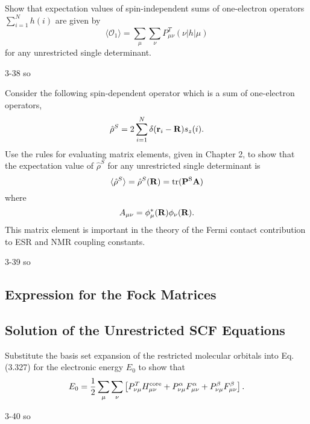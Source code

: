 \documentclass[a4paper]{book}
\newcommand\tr[1]{\mathrm{tr(#1)}}
\newcommand{\core}{{\rm core}}
\newcommand{\R}{{\bf R}}
\begin{document}
	\begin{exercise}
	Show that expectation values of spin-independent sums of one-electron operators $\sum_{i=1}^N h(i)$ are given by
	\[
		\langle \mathscr{O}_1 \rangle = \sum_\mu \sum_\nu P^T_{\mu\nu} ( \nu | h | \mu )
	\]
	for any unrestricted single determinant.
	\end{exercise}
	
	\begin{solution}
		3-38 so
	\end{solution}
	
	\begin{exercise}
	Consider the following spin-dependent operator which is a sum of one-electron operators,
	\[
		\hat{\rho}^S = 2 \sum_{i=1}^N \delta( {\bf r}_i - {\bf R} )s_z(i).
	\]
	Use the rules for evaluating matrix elements, given in Chapter 2, to show that the expectation value of $\hat{\rho}^S$ for any unrestricted single determinant is
	\[
		\langle \hat{\rho}^S \rangle = \hat{\rho}^S ({\bf R}) = \tr{  {\bf P}^S {\bf A}} 
	\]
	where
	\[
		A_{\mu\nu} = \phi^*_\mu (\R) \phi_\nu (\R).
	\]
	This matrix element is important in the theory of the Fermi contact contribution to ESR and NMR coupling constants.
	\end{exercise}
	
	\begin{solution}
		3-39 so
	\end{solution}
	
	\subsection{Expression for the Fock Matrices}
	
	\subsection{Solution of the Unrestricted SCF Equations}
	
	\begin{exercise}
	Substitute the basis set expansion of the restricted molecular orbitals into Eq.(3.327) for the electronic energy $E_0$ to show that
	\[
		E_0 = \frac{1}{2} \sum_\mu \sum_\nu \left[ P^T_{\nu\mu} H^{\core}_{\mu\nu} + P^\alpha_{\nu\mu} F^\alpha_{\mu\nu} + P^\beta_{\nu\mu} F^\beta_{\mu\nu} \right].
	\]
	\end{exercise}
	
	\begin{solution}
		3-40 so
	\end{solution}
	
\end{document}
